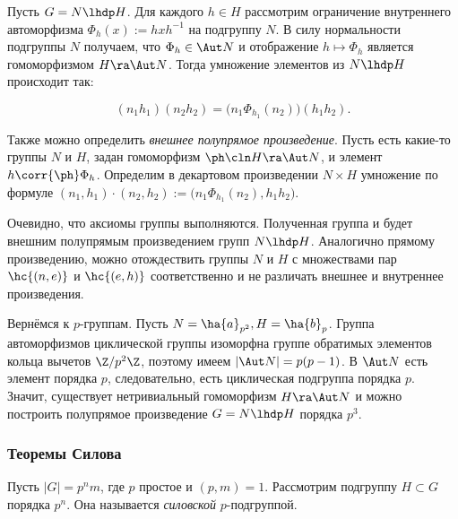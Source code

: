 \documentclass[a4paper]{article}
\begin{document}
Пусть $G = N \lhdp H$. Для каждого $h \in H$ рассмотрим ограничение внутреннего автоморфизма $\Phi_h(x):=
hxh^{-1}$  на подгруппу $N$. В силу нормальности подгруппы $N$ получаем, что $\Phi_h \in \Aut N$ и
отображение $h \mapsto \Phi_h$ является гомоморфизмом $H \ra \Aut N$. Тогда умножение элементов из $N \lhdp
H$ происходит так:

$$(n_1h_1)(n_2h_2)=\bigl(n_1\Phi_{h_1}(n_2)\bigr)(h_1h_2).$$

Также можно определить \emph{\emph{внешнее полупрямое произведение}}. Пусть есть какие-то группы $N$ и
$H$,  задан гомоморфизм $\ph\cln H \ra \Aut N$, и элемент $h \corr{\ph} \Phi_h$. Определим в декартовом
произведении $N \times H$ умножение по формуле $(n_1, h_1)\cdot(n_2, h_2):=\bigl(n_1
\Phi_{h_1}(n_2),h_1h_2\bigr)$.

Очевидно, что аксиомы группы выполняются. Полученная группа и будет внешним полупрямым произведением групп
$N \lhdp H$. Аналогично прямому произведению, можно отождествить группы $N$ и $H$ с множествами пар
$\hc{(n,e)}$ и $\hc{(e,h)}$ соответственно и не различать внешнее и внутреннее произведения.

Вернёмся к $p$-группам. Пусть $N = \ha{a}_{p^2}, H = \ha{b}_p$. Группа автоморфизмов циклической группы
изоморфна группе обратимых элементов кольца вычетов $\Z/p^2\Z$, поэтому имеем $|\Aut N|=p(p-1)$. В $\Aut N$
есть элемент порядка $p$, следовательно, есть циклическая подгруппа порядка $p$. Значит, существует
нетривиальный гомоморфизм $H \ra \Aut N$ и можно построить полупрямое произведение $G = N \lhdp H$ порядка
$p^3$.

\subsubsection{Теоремы Силова}

\begin{df}
Пусть $|G| = p^n m$, где $p$ простое и $(p,m)=1$. Рассмотрим подгруппу $H \subset G$ порядка $p^n$.  Она
называется \emph{силовской} $p$-подгруппой.
\end{df}
\end{document}
